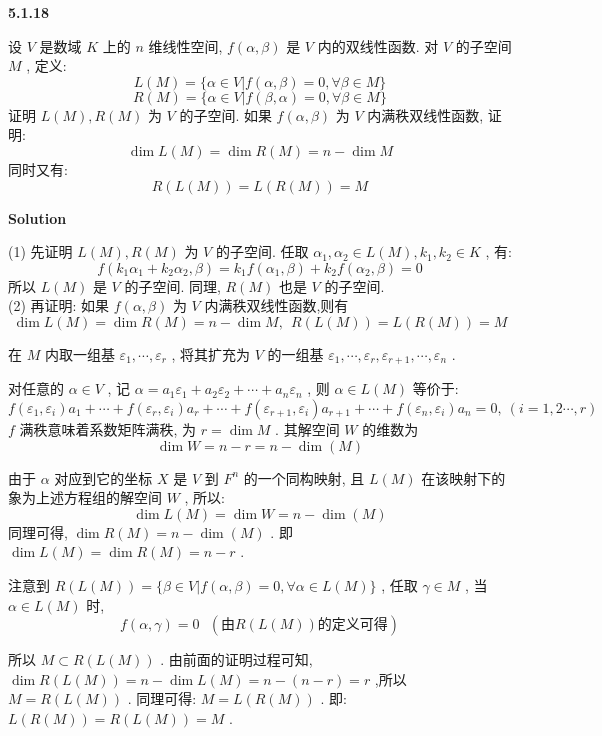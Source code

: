 \documentclass[11pt,a4paper,openany,oneside]{book}
\newcommand\Solution{\noindent\textbf{\textsf{Solution}}\par\medskip}
\begin{document}
\begin{myexample}
	\textbf{5.1.18} 

设 $ V $ 是数域 $ K $ 上的 $ n $ 维线性空间,  $ f(\alpha, \beta) $ 是 $ V $ 内的双线性函数. 对 $ V $ 的子空间 $ M $ , 定义:
 $$  L(M) = \{\alpha \in V | f(\alpha, \beta)=0, \forall \beta \in M  \}  $$ 
 $$  R(M) = \{\alpha \in V | f(\beta, \alpha)=0, \forall \beta \in M  \}  $$ 
证明 $ L(M), R(M) $ 为 $ V $ 的子空间. 如果 $ f(\alpha, \beta) $ 为 $ V $ 内满秩双线性函数, 证明:
 $$  \dim L(M) = \dim R(M) = n - \dim M   $$ 
同时又有:
 $$  R(L(M)) = L(R(M)) = M  $$ 

\end{myexample}
\Solution 

(1) 先证明 $ L(M), R(M) $ 为 $ V $ 的子空间. 任取 $ \alpha_1, \alpha_2 \in L(M), k_1, k_2 \in K $ , 有:
 $$ f(k_1\alpha_1 + k_2\alpha_2, \beta ) = k_1f(\alpha_1, \beta) + k_2f(\alpha_2, \beta) = 0 $$ 
所以 $ L(M) $ 是 $ V $ 的子空间. 同理,  $ R(M) $ 也是 $ V $ 的子空间. \\

(2) 再证明: 如果 $ f(\alpha, \beta) $ 为 $ V $ 内满秩双线性函数,则有
 $$  \dim L(M) = \dim R(M) = n - \dim M, \ \  R(L(M)) = L(R(M)) = M  $$  

在 $ M $ 内取一组基 $ \varepsilon_1, \cdots, \varepsilon_r $ , 将其扩充为 $ V $ 的一组基 $ \varepsilon_1, \cdots, \varepsilon_r, \varepsilon_{r+1}, \cdots, \varepsilon_n $ .

对任意的 $ \alpha \in V $ , 记 $ \alpha = a_1\varepsilon_1 + a_2\varepsilon_2 + \cdots + a_n \varepsilon_n $ , 则 $ \alpha \in L(M) $ 等价于:
 $$  f(\varepsilon_1, \varepsilon_i)a_1 + \cdots + f(\varepsilon_r, \varepsilon_i)a_r + \cdots + f(\varepsilon_{r+1}, \varepsilon_i)a_{r+1} + \cdots + f(\varepsilon_n, \varepsilon_i)a_n = 0, \ (i=1, 2 \cdots, r) $$ 
 $ f $ 满秩意味着系数矩阵满秩, 为 $ r = \dim M $ . 其解空间 $ W $ 的维数为
 $$ \dim W = n -r = n- \dim (M) $$ 

由于 $ \alpha $ 对应到它的坐标 $ X $ 是 $ V $ 到 $ F^n $ 的一个同构映射, 且 $ L(M) $ 在该映射下的象为上述方程组的解空间 $ W $ , 所以:
 $$  \dim L(M) = \dim  W = n - \dim (M)  $$ 
同理可得,  $ \dim R(M) = n -\dim (M) $ . 即 $ \dim L(M) = \dim  R(M) = n-r $ .

注意到 $ R(L(M)) = \{ \beta \in V | f(\alpha, \beta) =0, \forall \alpha \in L(M) \} $ , 任取 $ \gamma \in M $ , 当 $ \alpha \in L(M) $ 时,
 $$  f(\alpha, \gamma ) = 0 \ \ \ (\text{由}R(L(M))\text{的定义可得})  $$ 

所以 $ M \subset R(L(M)) $ . 由前面的证明过程可知,  $ \dim R(L(M)) = n - \dim L(M) = n-(n-r) = r  $ ,所以 $ M = R(L(M)) $ .
同理可得:  $ M = L(R(M)) $ . 即:  $ L(R(M)) = R(L(M)) = M $ . \\  \\  \\ 
\end{document}
